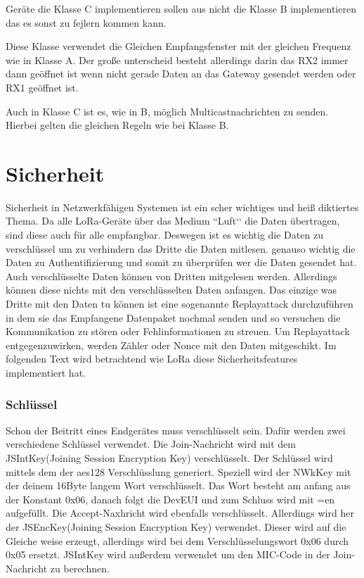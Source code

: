 \documentclass[a4paper,12pt]{article}
\begin{document}
            Geräte die Klasse C implementieren sollen aus nicht die Klasse B implementieren das es sonst zu fejlern 
            kommen kann.

            Diese Klasse verwendet die Gleichen Empfangsfenster mit der gleichen Frequenz wie in Klasse A. Der große 
            unterscheid besteht allerdings darin das RX2 immer dann geöffnet ist wenn nicht gerade Daten an das 
            Gateway gesendet werden oder RX1 geöffnet ist. 

            Auch in Klasse C ist es, wie in B, möglich Multicastnachrichten zu senden. Hierbei gelten die gleichen 
            Regeln wie bei Klasse B.

    \section{Sicherheit} \label{sec:Sicherheit}  
        Sicherheit in Netzwerkfähigen Systemen ist ein scher wichtiges und heiß diktiertes Thema. Da alle LoRa-Geräte 
        über das Medium ``Luft‘‘ die Daten übertragen, sind diese auch für alle empfangbar. Deswegen ist es wichtig 
        die Daten zu verschlüssel um zu verhindern das Dritte die Daten mitlesen. genauso wichtig die Daten zu 
        Authentifizierung und somit zu überprüfen wer die Daten gesendet hat. Auch verschlüsselte Daten können von 
        Dritten mitgelesen werden. Allerdings können diese nichts mit den verschlüsselten Daten anfangen. Das einzige 
        was Dritte mit den Daten tu können ist eine sogenannte Replayattack durchzuführen in dem sie das Empfangene 
        Datenpaket nochmal senden und so versuchen die Kommunikation zu stören oder Fehlinformationen zu streuen. Um 
        Replayattack entgegenzuwirken, werden Zähler oder Nonce mit den Daten mitgeschikt. Im folgenden Text wird 
        betrachtend wie LoRa diese Sicherheitsfeatures implementiert hat.

        \subsubsection{Schlüssel}
            Schon der Beitritt eines Endgerätes muss verschlüsselt sein. Dafür werden zwei verschiedene Schlüssel 
            verwendet. Die Join-Nachricht wird mit dem JSIntKey(Joining Session Encryption Key) verschlüsselt. Der 
            Schlüssel wird mittels dem der aes128 Verschlüsslung generiert. Speziell wird der NWkKey mit der deinem 
            16Byte langem Wort verschlüsselt. Das Wort besteht am anfang aus der Konstant 0x06, danach folgt die DevEUI 
            und zum Schluss wird mit =en aufgefüllt. Die Accept-Naxhricht wird ebenfalls verschlüsselt. Allerdings wird 
            her der JSEncKey(Joining Session Encryption Key) verwendet. Dieser wird auf die Gleiche weise erzeugt, 
            allerdings wird bei dem Verschlüsselungswort 0x06 durch 0x05 ersetzt. JSIntKey wird außerdem verwendet um den 
            MIC-Code in der Join-Nachricht zu berechnen.
\end{document}
